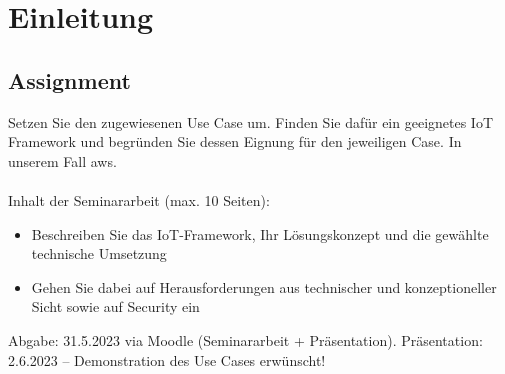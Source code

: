 \chapter{Einleitung}

\section{Assignment}
Setzen Sie den zugewiesenen Use Case um.
Finden Sie dafür ein geeignetes IoT Framework und begründen Sie dessen Eignung für den jeweiligen Case. In unserem Fall \ac{aws}.\\
\\
Inhalt der Seminararbeit (max. 10 Seiten):
\begin{itemize}
    \item Beschreiben Sie das IoT-Framework, Ihr Lösungskonzept und die gewählte technische Umsetzung
    \item Gehen Sie dabei auf Herausforderungen aus technischer und konzeptioneller Sicht sowie auf Security ein
\end{itemize}
Abgabe: 31.5.2023 via Moodle (Seminararbeit + Präsentation). Präsentation: 2.6.2023 – Demonstration des Use Cases erwünscht!



